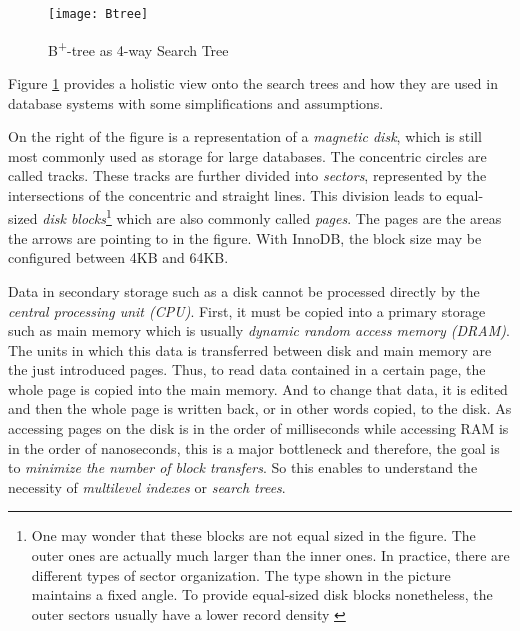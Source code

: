 \begin{figure}[H]
	\centering
	\texttt{[image: Btree]}
	\caption[B\textsuperscript{+}-tree as 4-way Search Tree]{B\textsuperscript{+}-tree as 4-way Search Tree }
	\label{fig:B+tree}
\end{figure}

Figure \ref{fig:B+tree} provides a holistic view onto the search trees and how they are used in database systems with some simplifications and assumptions.\par %
On the right of the figure is a representation of a \emph{magnetic disk}, which is still most commonly used as storage for large databases. The concentric circles are called tracks. These tracks are further divided into \emph{sectors}, represented by the intersections of the concentric and straight lines. This division leads to equal-sized \emph{disk blocks}\footnote{One may wonder that these blocks are not equal sized in the figure. The outer ones are actually much larger than the inner ones. In practice, there are different types of sector organization. The type shown in the picture maintains a fixed angle. To provide equal-sized disk blocks nonetheless, the outer sectors usually have a lower record density \cite{DatabaseFundamentals}} which are also commonly called \emph{pages}. The pages are the areas the arrows are pointing to in the figure. With InnoDB, the block size may be configured between 4KB and 64KB.\par 
Data in secondary storage such as a disk cannot be processed directly by the \emph{central processing unit (CPU)}. First, it must be copied into a primary storage such as main memory which is usually \emph{dynamic random access memory (DRAM)}. %
The units in which this data is transferred between disk and main memory are the just introduced pages. Thus, to read data contained in a certain page, the whole page is copied into the main memory. And to change that data, it is edited and then the whole page is written back, or in other words copied, to the disk. As accessing pages on the disk is in the order of milliseconds while accessing RAM is in the order of nanoseconds, this is a major bottleneck and therefore, the goal is to \emph{minimize the number of block transfers}. So this enables to understand the necessity of \emph{multilevel indexes} or \emph{search trees}.\par
